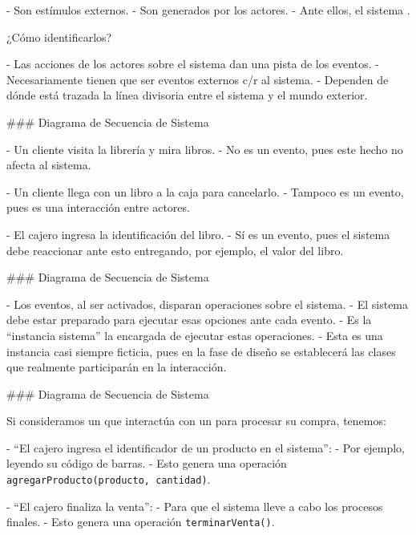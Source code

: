
- Son estímulos externos.
- Son generados por los actores.
- Ante ellos, el sistema .

\pause

¿Cómo identificarlos?

- Las acciones de los actores sobre el sistema dan una pista de los eventos.
- Necesariamente tienen que ser eventos externos c/r al sistema.
- Dependen de dónde está trazada la línea divisoria entre el sistema y el mundo exterior.

### Diagrama de Secuencia de Sistema


- Un cliente visita la librería y mira libros.
    - No es un evento, pues este hecho no afecta al sistema.

\vfill

- Un cliente llega con un libro a la caja para cancelarlo.
    - Tampoco es un evento, pues es una interacción entre actores.


\vfill

- El cajero ingresa la identificación del libro.
    - Sí es un evento, pues el sistema debe reaccionar ante esto entregando, por ejemplo,
    el valor del libro.

### Diagrama de Secuencia de Sistema


- Los eventos, al ser activados, disparan operaciones sobre el sistema.
- El sistema debe estar preparado para ejecutar esas opciones ante cada evento.
- Es la ``instancia sistema'' la encargada de ejecutar estas operaciones.
    - Esta es una instancia casi siempre ficticia, pues en la fase de diseño
    se establecerá las clases que realmente participarán en la interacción.

### Diagrama de Secuencia de Sistema


Si consideramos un  que interactúa con un  para procesar su compra,
tenemos:

\vfill

- ``El cajero ingresa el identificador de un producto en el sistema'':
    - Por ejemplo, leyendo su código de barras.
    - Esto genera una operación \texttt{agregarProducto(producto, cantidad)}.


\vfill

- ``El cajero finaliza la venta'':
    - Para que el sistema lleve a cabo los procesos finales.
    - Esto genera una operación \texttt{terminarVenta()}.

